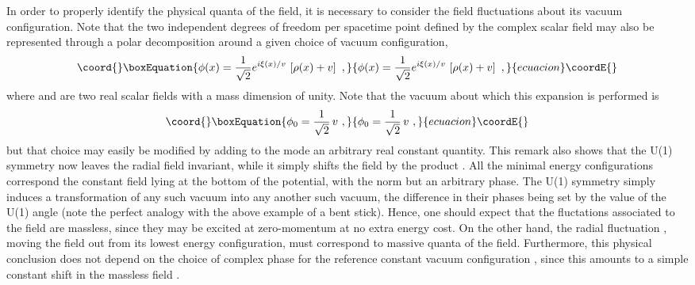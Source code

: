 \documentclass[a4paper,11pt]{article}
\begin{document}
In order to properly identify the physical quanta of the field, it is
necessary to consider the field fluctuations about its vacuum configuration.
Note that the two independent degrees of freedom per spacetime point
defined by the complex scalar field may also be represented through
a polar decomposition around a given choice of vacuum configuration,
\begin{equation}\coord{}\boxEquation{
\phi(x)=\frac{1}{\sqrt{2}}e^{i\xi(x)/v}\,
\left[\rho(x)+v\right]\ ,
\label{eq:fluct}
}{
\phi(x)=\frac{1}{\sqrt{2}}e^{i\xi(x)/v}\,
\left[\rho(x)+v\right]\ ,
}{ecuacion}\coordE{}\end{equation}
where \coordHE{} and \coordHE{} are two real scalar fields with a mass dimension
of unity. Note that the vacuum about which this expansion is performed is
\begin{equation}\coord{}\boxEquation{
\phi_0=\frac{1}{\sqrt{2}}\,v\ ,
}{
\phi_0=\frac{1}{\sqrt{2}}\,v\ ,
}{ecuacion}\coordE{}\end{equation}
but that choice may easily be modified by adding to the mode \coordHE{}
an arbitrary real constant quantity. This remark also shows that
the U(1) symmetry now leaves the radial field \coordHE{} invariant,
while it simply shifts the field \coordHE{} by the product \coordHE{}.
All the minimal energy configurations correspond the constant field \myHighlight{$\phi$}\coordHE{} 
lying at the bottom of the potential, with the norm \coordHE{} but an
arbitrary phase. The U(1) symmetry simply induces a transformation of
any such vacuum into any another such vacuum, the difference in their phases
being set by the value of the U(1) angle \myHighlight{$\alpha$}\coordHE{} (note the perfect analogy
with the above example of a bent stick). Hence, one should expect that
the fluctations associated to the field \coordHE{} are massless, since they
may be excited at zero-momentum at no extra energy cost. On the other hand,
the radial fluctuation \coordHE{}, moving the field out from its lowest
energy configuration, must correspond to massive quanta of the field.
Furthermore, this physical conclusion does not depend on the choice of
complex phase for the reference constant vacuum configuration \coordHE{}, since
this amounts to a simple constant shift in the massless field \coordHE{}.
\end{document}
